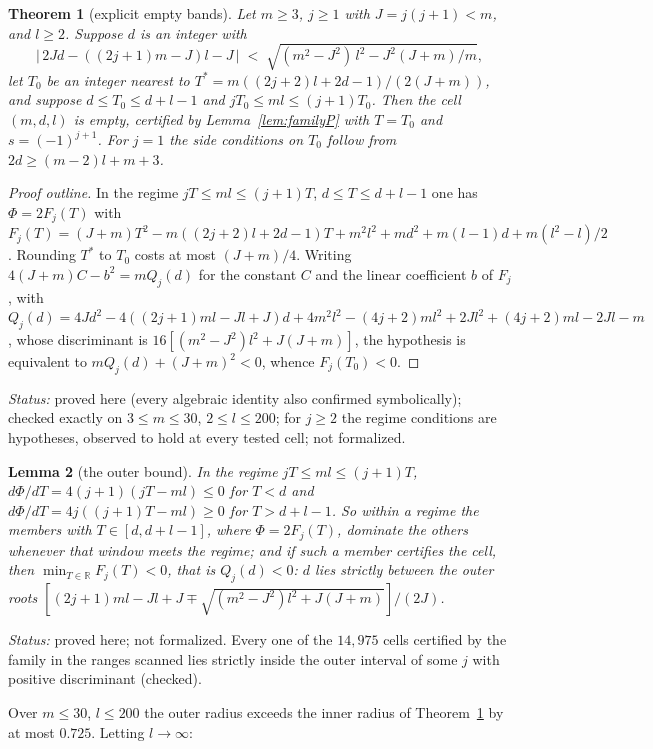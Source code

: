 \documentclass[11pt]{amsart}
\theoremstyle{plain}
\newtheorem{theorem}{Theorem}[section]
\newtheorem{lemma}[theorem]{Lemma}
\theoremstyle{definition}
\theoremstyle{remark}
\newcommand{\status}[1]{\par\smallskip
  {\small\raggedright\noindent\textit{Status:} #1\par}\smallskip}
\begin{document}
\begin{theorem}[explicit empty bands]\label{thm:bands}
Let $m \ge 3$, $j \ge 1$ with $J = j(j+1) < m$, and $l \ge 2$. Suppose $d$ is an integer
with
\[
  \bigl|\,2Jd - ((2j+1)m - J)l - J\,\bigr| \;<\;
  \sqrt{(m^2-J^2)\,l^2 - J^2(J+m)/m},
\]
let $T_0$ be an integer nearest to $T^* = m((2j+2)l + 2d - 1)/(2(J+m))$, and suppose
$d \le T_0 \le d+l-1$ and $jT_0 \le ml \le (j+1)T_0$. Then the cell $(m,d,l)$ is empty,
certified by Lemma~\ref{lem:familyP} with $T = T_0$ and $s = (-1)^{j+1}$. For $j = 1$ the
side conditions on $T_0$ follow from $2d \ge (m-2)l + m + 3$.
\end{theorem}

\begin{proof}[Proof outline]
In the regime $jT \le ml \le (j+1)T$, $d \le T \le d+l-1$ one has $\Phi = 2F_j(T)$ with
$F_j(T) = (J+m)T^2 - m((2j+2)l + 2d - 1)T + m^2l^2 + md^2 + m(l-1)d + m(l^2-l)/2$.
Rounding $T^*$ to $T_0$ costs at most $(J+m)/4$. Writing $4(J+m)C - b^2 = mQ_j(d)$ for the
constant $C$ and the linear coefficient $b$ of $F_j$, with
$Q_j(d) = 4Jd^2 - 4((2j+1)ml - Jl + J)d + 4m^2l^2 - (4j+2)ml^2 + 2Jl^2 + (4j+2)ml - 2Jl
- m$, whose discriminant is $16[(m^2-J^2)l^2 + J(J+m)]$, the hypothesis is equivalent
to $mQ_j(d) + (J+m)^2 < 0$, whence $F_j(T_0) < 0$.
\end{proof}
\status{proved here (every algebraic identity also confirmed symbolically); checked
exactly on $3 \le m \le 30$, $2 \le l \le 200$; for $j \ge 2$ the regime conditions are
hypotheses, observed to hold at every tested cell; not formalized.}

\begin{lemma}[the outer bound]\label{lem:outer}
In the regime $jT \le ml \le (j+1)T$, $d\Phi/dT = 4(j+1)(jT - ml) \le 0$ for $T < d$ and
$d\Phi/dT = 4j((j+1)T - ml) \ge 0$ for $T > d + l - 1$. So within a regime the members
with $T \in [d,d+l-1]$, where $\Phi = 2F_j(T)$, dominate the others whenever that window
meets the regime; and if such a member certifies the cell, then $\min_{T \in \mathbb{R}}
F_j(T) < 0$, that is $Q_j(d) < 0$: $d$ lies strictly between the \emph{outer roots}
$[(2j+1)ml - Jl + J \mp \sqrt{(m^2-J^2)l^2 + J(J+m)}]/(2J)$.
\end{lemma}
\status{proved here; not formalized. Every one of the $14{,}975$ cells certified by the
family in the ranges scanned lies strictly inside the outer interval of some $j$ with
positive discriminant (checked).}

Over $m \le 30$, $l \le 200$ the outer radius exceeds the inner radius of
Theorem~\ref{thm:bands} by at most $0.725$. Letting $l \to \infty$:
\end{document}
